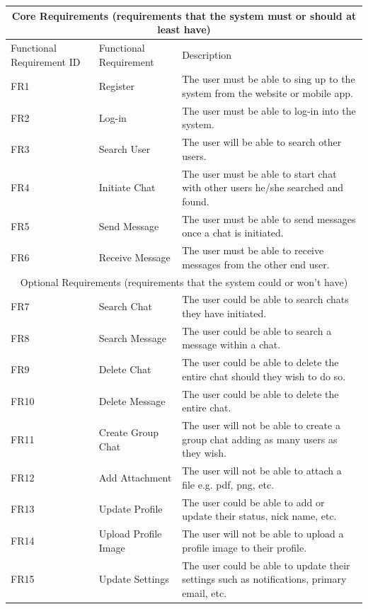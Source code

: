 \documentclass{article}
\begin{document}
\begin{center}
\begin{tabular}{ |p{5cm}|p{5cm}|p{5cm}|  }
 \hline
 \multicolumn{3}{|c|}{Core Requirements (requirements that the system must or should at least have)} \\
 \hline
 Functional Requirement ID & Functional Requirement & Description\\
 \hline
 FR1 & Register & The user must be able to sing up to the system from the website or mobile app.\\
 \hline
 FR2 & Log-in  & The user must be able to log-in into the system.\\
 \hline
 FR3 & Search User & The user will be able to search other users. \\
 \hline
 FR4 & Initiate Chat & The user must be able to start chat with other users he/she searched and found. \\
 \hline
 FR5 & Send Message  & The user must be able to send messages once a chat is initiated.\\
 \hline
 FR6 & Receive Message  & The user must be able to receive messages from the other end user.\\
 \hline
 \multicolumn{3}{|c|}{Optional Requirements (requirements that the system could or won't have)} \\
 \hline
 FR7 & Search Chat & The user could be able to search chats they have initiated. \\
 \hline
 FR8 & Search Message & The user could be able to search a message within a chat. \\
 \hline
 FR9 & Delete Chat & The user could be able to delete the entire chat should they wish to do so. \\
 \hline
 FR10 & Delete Message & The user could be able to delete the entire chat. \\
 \hline
 FR11 & Create Group Chat & The user will not be able to create a group chat adding as many users as they wish. \\
 \hline
 FR12 & Add Attachment & The user will not be able to attach a file e.g. pdf, png, etc.\\
 \hline
 FR13 & Update Profile & The user could be able to add or update their status, nick name, etc. \\
 \hline
 FR14 & Upload Profile Image & The user will not be able to upload a profile image to their profile.\\
 \hline
 FR15 & Update Settings & The user could be able to update their settings such as notifications, primary email, etc. \\
 \hline
\end{tabular}
\end{center}
\end{document}
